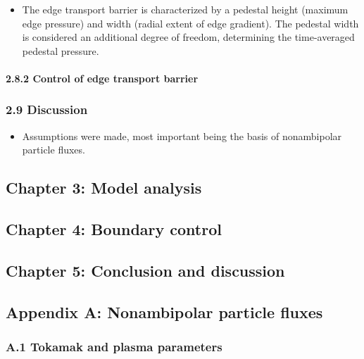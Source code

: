 \documentclass[]{article}
\providecommand{\tightlist}{%
  \setlength{\itemsep}{0pt}\setlength{\parskip}{0pt}}
\let\oldparagraph\paragraph
\renewcommand{\paragraph}[1]{\oldparagraph{#1}\mbox{}}
\begin{document}
\begin{itemize}
\tightlist
\item
  The edge transport barrier is characterized by a pedestal height
  (maximum edge pressure) and width (radial extent of edge gradient).
  The pedestal width is considered an additional degree of freedom,
  determining the time-averaged pedestal pressure.
\end{itemize}

\paragraph{2.8.2 Control of edge transport
barrier}\label{control-of-edge-transport-barrier}

\subsubsection{2.9 Discussion}\label{discussion}

\begin{itemize}
\tightlist
\item
  Assumptions were made, most important being the basis of nonambipolar
  particle fluxes.
\end{itemize}

\subsection{Chapter 3: Model analysis}\label{chapter-3-model-analysis}

\subsection{Chapter 4: Boundary
control}\label{chapter-4-boundary-control}

\subsection{Chapter 5: Conclusion and
discussion}\label{chapter-5-conclusion-and-discussion}

\subsection{Appendix A: Nonambipolar particle
fluxes}\label{appendix-a-nonambipolar-particle-fluxes}

\subsubsection{A.1 Tokamak and plasma
parameters}\label{a.1-tokamak-and-plasma-parameters}
\end{document}
